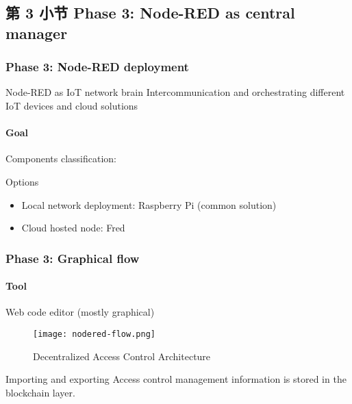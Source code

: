 \documentclass[
    aspectratio=169,                   %
]{beamer}
\begin{document}
\subsection{第 3 小节 Phase 3: Node-RED as central manager}

    \begin{frame}
        \frametitle{Phase 3: Node-RED deployment}

        \begin{block}{Node-RED as IoT network brain}
            Intercommunication and orchestrating different IoT devices and cloud solutions
        \end{block}

        \paragraph{Goal} Components classification:

        \begin{block}{Options}
            \begin{itemize}
                \item \alert{Local network deployment}: Raspberry Pi (common solution)
                \item \alert{Cloud hosted node}: Fred
            \end{itemize}
        \end{block}

    \end{frame}

    \begin{frame}
        \frametitle{Phase 3: Graphical flow}

        \paragraph{Tool} Web code editor (mostly graphical)

        \begin{figure}
            \centering
            \begin{stampbox}
                \texttt{[image: nodered-flow.png]}
            \end{stampbox}
            \caption{Decentralized Access Control Architecture\cite{novo}}
        \end{figure}

        \begin{block}{Importing and exporting}
            Access control management information is stored in the blockchain layer.\cite{novo}
        \end{block}
        
    \end{frame}
\end{document}
